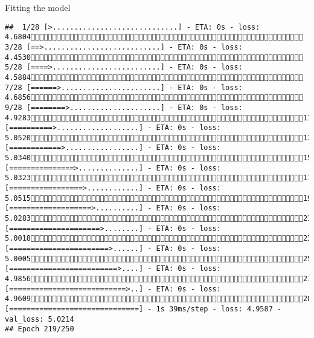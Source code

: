 \documentclass[
  ignorenonframetext,
]{beamer}
\begin{document}
\begin{frame}[fragile]{Fitting the model}
\begin{verbatim}
##  1/28 [>.............................] - ETA: 0s - loss: 4.6804 3/28 [==>...........................] - ETA: 0s - loss: 4.4530 5/28 [====>.........................] - ETA: 0s - loss: 4.5884 7/28 [======>.......................] - ETA: 0s - loss: 4.6856 9/28 [========>.....................] - ETA: 0s - loss: 4.928311/28 [==========>...................] - ETA: 0s - loss: 5.052013/28 [============>.................] - ETA: 0s - loss: 5.034015/28 [===============>..............] - ETA: 0s - loss: 5.032317/28 [=================>............] - ETA: 0s - loss: 5.051519/28 [===================>..........] - ETA: 0s - loss: 5.028321/28 [=====================>........] - ETA: 0s - loss: 5.001823/28 [=======================>......] - ETA: 0s - loss: 5.000525/28 [=========================>....] - ETA: 0s - loss: 4.985627/28 [===========================>..] - ETA: 0s - loss: 4.960928/28 [==============================] - 1s 39ms/step - loss: 4.9587 - val_loss: 5.0214
## Epoch 219/250

\end{verbatim}
\end{frame}
\end{document}
